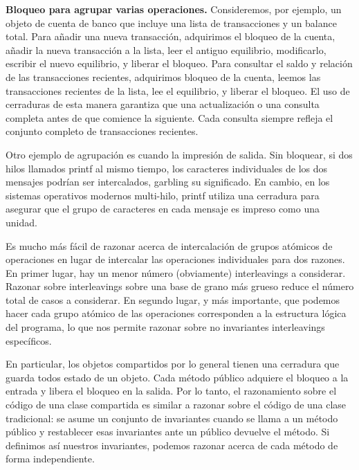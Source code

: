 \documentclass[10pt]{book}
\begin{document}
\textbf{Bloqueo para agrupar varias operaciones.} Consideremos, por ejemplo, un objeto de cuenta de banco que incluye una lista de transacciones y un balance total. Para añadir una nueva transacción, adquirimos el bloqueo de la cuenta, añadir la nueva transacción a la lista, leer el antiguo equilibrio, modificarlo, escribir el nuevo equilibrio, y liberar el bloqueo. Para consultar el saldo y relación de las transacciones recientes, adquirimos bloqueo de la cuenta, leemos las transacciones recientes de la lista, lee el equilibrio, y liberar el bloqueo. El uso de cerraduras de esta manera garantiza que una actualización o una consulta completa antes de que comience la siguiente. Cada consulta siempre refleja el conjunto completo de transacciones recientes.

Otro ejemplo de agrupación es cuando la impresión de salida. Sin bloquear, si dos hilos llamados printf al mismo tiempo, los caracteres individuales de los dos mensajes podrían ser intercalados, garbling su significado. En cambio, en los sistemas operativos modernos multi-hilo, printf utiliza una cerradura para asegurar que el grupo de caracteres en cada mensaje es impreso como una unidad.

Es mucho más fácil de razonar acerca de intercalación de grupos atómicos de operaciones en lugar de intercalar las operaciones individuales para dos razones. En primer lugar, hay un menor número (obviamente) interleavings a considerar. Razonar sobre interleavings sobre una base de grano más grueso reduce el número total de casos a considerar. En segundo lugar, y más importante, que podemos hacer cada grupo atómico de las operaciones corresponden a la estructura lógica del programa, lo que nos permite razonar sobre no invariantes interleavings específicos.

En particular, los objetos compartidos por lo general tienen una cerradura que guarda todos estado de un objeto. Cada método público adquiere el bloqueo a la entrada y libera el bloqueo en la salida. Por lo tanto, el razonamiento sobre el código de una clase compartida es similar a razonar sobre el código de una clase tradicional: se asume un conjunto de invariantes cuando se llama a un método público y restablecer esas invariantes ante un público devuelve el método. Si definimos así nuestros invariantes, podemos razonar acerca de cada método de forma independiente.
\end{document}
